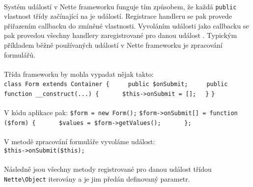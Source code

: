 \documentclass[11pt,oneside]{fithesis}
\begin{document}
        \paragraph*{}
        Systém událostí v Nette frameworku funguje tím způsobem, že každá \verb|public| vlastnost třídy začínající na  je událostí. Registrace handleru se pak provede přiřazením callbacku do zmíněné vlastnosti. Vyvoláním události jako callbacku se pak provedou všechny handlery zaregistrované pro danou událost \cite{nette}. Typickým příkladem běžně používaných událostí v Nette frameworku je zpracování formulářů.
        \paragraph*{}
        Třída frameworku by mohla vypadat nějak takto:\\
        \verb|class Form extends Container {|
        \newline\verb|  |
        \newline\verb|  public $onSubmit;|
        \newline\verb|  |
        \newline\verb|  public function __construct(...) {|
        \newline\verb|      $this->onSubmit = [];|
        \newline\verb|  }|
        \newline\verb|}|
        \paragraph*{}
        V kódu aplikace pak:
        \newline\verb|$form = new Form();|
        \newline\verb|$form->onSubmit[] = function ($form) {|
        \newline\verb|      $values = $form->getValues();|
        \newline\verb|      };|
        \paragraph*{}
        V metodě zpracování formuláře vyvoláme událost:\\
        \noindent\verb|$this->onSubmit($this);|
        \paragraph*{}
        Následně jsou všechny metody registrované pro danou událost třídou \verb|Nette\Object| iterovány a je jim předán definovaný parametr.
\end{document}
